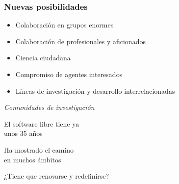 \documentclass[17pt,aspectratio=169]{beamer}
\begin{document}

\begin{frame}
\frametitle{Nuevas posibilidades}

\begin{itemize}
\item Colaboración en grupos enormes
\item Colaboración de profesionales y aficionados
\item Ciencia ciudadana
\item Compromiso de agentes interesados
\item Líneas de investigación y desarrollo interrelacionadas
\end{itemize}

\begin{center}
  {\Large \em Comunidades de investigación}
\end{center}
\end{frame}


\begin{frame}

  \begin{center}
  {\Large
    El software libre tiene ya \\
    unos 35 años\\

    \vspace{.5cm}
    
    Ha mostrado el camino\\
    en muchos ámbitos\\

    \vspace{.5cm}
    
    ¿Tiene que renovarse y redefinirse?\\
  }
  \end{center}
\end{frame}

\end{document}
